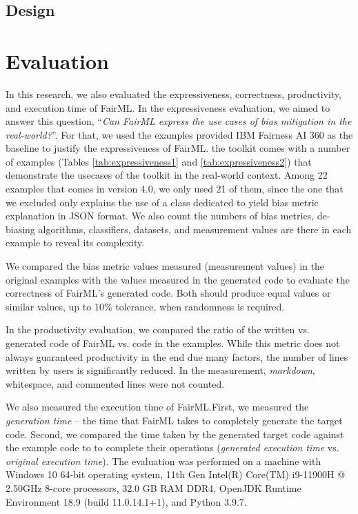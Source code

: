 \documentclass[sigconf,review]{acmart}
\begin{document}
\subsection{Design}
\label{sec:design}



\section{Evaluation}
\label{sec:evaluation}
In this research, we also evaluated the expressiveness, correctness, productivity, and execution time of FairML. In the expressiveness evaluation, we aimed to answer this question, 
``\textit{Can FairML express the use cases of bias mitigation in the real-world?}''. For that, we used the examples provided IBM Fairness AI 360 as the baseline to justify the expressiveness of FairML. 
the toolkit comes with a number of examples (Tables \ref{tab:expressiveness1} and \ref{tab:expressiveness2}) that demonstrate 
the usecases of the toolkit in the real-world context. 
Among 22 examples that comes in version 4.0, we only used 21 of them, 
since the one that we excluded only explains the use of a class dedicated to yield bias metric explanation in JSON format. We also count the numbers of bias metrics, de-biasing algorithms, classifiers, datasets, and measurement values are there in each example to reveal its complexity. 

We compared the bias metric values measured (measurement values) in the original examples with the values measured in the generated code to evaluate the correctness of FairML's generated code. Both should produce equal values or similar values, up to 10\% tolerance, when randomness is required.  

In the productivity evaluation, 
we compared the ratio of the written vs. generated code of FairML vs.
code in the examples. 
While this metric does not always guaranteed productivity in the end due many factors, 
the number of lines written by users is significantly reduced. In the measurement, \textit{markdown}, whitespace, and commented lines were not counted.

We also measured the execution time of FairML.First, we measured the \textit{generation time} -- the time that FairML takes to completely generate the target code. Second, we compared the time taken by the generated target code against the example code to to complete their operations (\textit{generated execution time} vs. \textit{original execution time}). The evaluation was performed on a machine with Windows 10 64-bit operating system, 11th Gen Intel(R) Core(TM) i9-11900H @ 2.50GHz 8-core processors, 32.0 GB RAM DDR4, OpenJDK Runtime Environment 18.9 (build 11.0.14.1+1), and Python 3.9.7.
\end{document}
